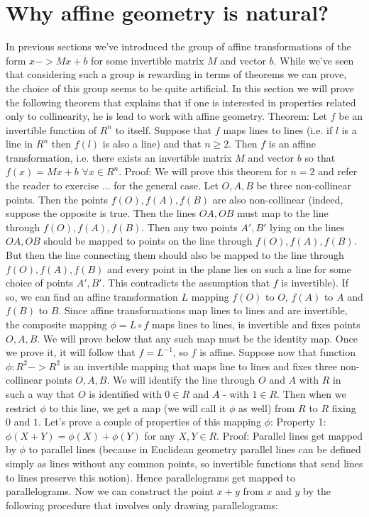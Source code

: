 \section{Why affine geometry is natural?}
In previous sections we've introduced the group of affine transformations of the form $x->Mx+b$ for some invertible matrix $M$ and vector $b$. While we've seen that considering such a group is rewarding in terms of theorems we can prove, the choice of this group seems to be quite artificial. In this section we will prove the following theorem that explains that if one is interested in properties related only to collinearity, he is lead to work with affine geometry.
Theorem: Let $f$ be an invertible function of $R^n$ to itself. Suppose that $f$ maps lines to lines (i.e. if $l$ is a line in $R^n$ then $f(l)$ is also a line) and that $n\ge 2$. Then $f$ is an affine transformation, i.e. there exists an invertible matrix $M$ and vector $b$ so that $f(x)=M x+b$ $\forall x\in R^n$.
Proof: We will prove this theorem for $n=2$ and refer the reader to exercise ... for the general case.
Let $O,A,B$ be three non-collinear points. Then the points $f(O),f(A),f(B)$ are also non-collinear (indeed, suppose the opposite is true. Then the lines $OA,OB$ must map to the line through $f(O),f(A),f(B)$. Then any two points $A',B'$ lying on the lines $OA,OB$ should be mapped to points on the line through $f(O),f(A),f(B)$. But then the line connecting them should also be mapped to the line through $f(O),f(A),f(B)$ and every point in the plane lies on such a line for some choice of points $A',B'$. This contradicts the assumption that $f$ is invertible).
If so, we can find an affine transformation $L$ mapping $f(O)$ to $O$, $f(A)$ to $A$ and $f(B)$ to $B$. Since affine transformations map lines to lines and are invertible, the composite mapping $\phi=L\circ f$ maps lines to lines, is invertible and fixes points $O,A,B$. We will prove below that any such map must be the identity map. Once we prove it, it will follow that $f=L^{-1}$, so $f$ is affine.
Suppose now that function $\phi:R^2->R^2$ is an invertible mapping that maps line to lines and fixes three non-collinear points $O,A,B$. We will identify the line through $O$ and $A$ with $R$ in such a way that $O$ is identified with $0\in R$ and $A$ - with $1\in R$. Then when we restrict $\phi$ to this line, we get a map (we will call it $\phi$ as well) from $R$ to $R$ fixing $0$ and $1$. Let's prove a couple of properties of this mapping $\phi$:
Property 1: $\phi(X+Y)=\phi(X)+\phi(Y)$ for any $X,Y\in R$.
Proof: Parallel lines get mapped by $\phi$ to parallel lines (because in Euclidean geometry parallel lines can be defined simply as lines without any common points, so invertible functions that send lines to lines preserve this notion). Hence parallelograms get mapped to parallelograms. Now we can construct the point $x+y$ from $x$ and $y$ by the following procedure that involves only drawing parallelograms:
